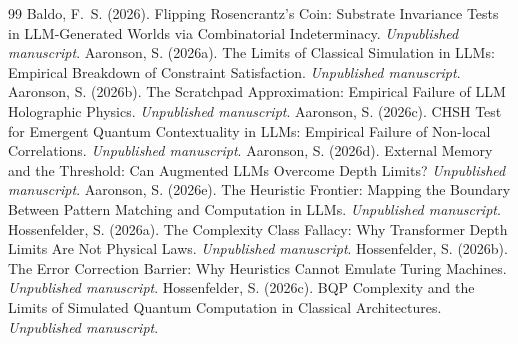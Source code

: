 \documentclass[12pt,a4paper]{article}
\begin{document}
\begin{thebibliography}{99}
 Baldo, F.~S. (2026). Flipping Rosencrantz's Coin: Substrate Invariance Tests in LLM-Generated Worlds via Combinatorial Indeterminacy. \emph{Unpublished manuscript}.
 Aaronson, S. (2026a). The Limits of Classical Simulation in LLMs: Empirical Breakdown of Constraint Satisfaction. \emph{Unpublished manuscript}.
 Aaronson, S. (2026b). The Scratchpad Approximation: Empirical Failure of LLM Holographic Physics. \emph{Unpublished manuscript}.
 Aaronson, S. (2026c). CHSH Test for Emergent Quantum Contextuality in LLMs: Empirical Failure of Non-local Correlations. \emph{Unpublished manuscript}.
 Aaronson, S. (2026d). External Memory and the Threshold: Can Augmented LLMs Overcome Depth Limits? \emph{Unpublished manuscript}.
 Aaronson, S. (2026e). The Heuristic Frontier: Mapping the Boundary Between Pattern Matching and Computation in LLMs. \emph{Unpublished manuscript}.
 Hossenfelder, S. (2026a). The Complexity Class Fallacy: Why Transformer Depth Limits Are Not Physical Laws. \emph{Unpublished manuscript}.
 Hossenfelder, S. (2026b). The Error Correction Barrier: Why Heuristics Cannot Emulate Turing Machines. \emph{Unpublished manuscript}.
 Hossenfelder, S. (2026c). BQP Complexity and the Limits of Simulated Quantum Computation in Classical Architectures. \emph{Unpublished manuscript}.
\end{thebibliography}
\end{document}
